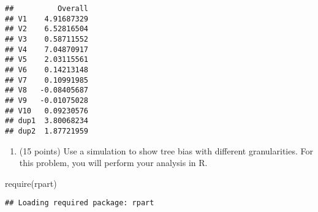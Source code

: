 \documentclass[
]{article}
\newenvironment{Shaded}{\begin{snugshade}}{\end{snugshade}}
\newcommand{\FunctionTok}[1]{\textcolor[rgb]{0.00,0.00,0.00}{#1}}
\newcommand{\NormalTok}[1]{#1}
\providecommand{\tightlist}{%
  \setlength{\itemsep}{0pt}\setlength{\parskip}{0pt}}
\begin{document}
\begin{verbatim}
##          Overall
## V1    4.91687329
## V2    6.52816504
## V3    0.58711552
## V4    7.04870917
## V5    2.03115561
## V6    0.14213148
## V7    0.10991985
## V8   -0.08405687
## V9   -0.01075028
## V10   0.09230576
## dup1  3.80068234
## dup2  1.87721959
\end{verbatim}

\begin{enumerate}
\def\labelenumi{\arabic{enumi}.}
\setcounter{enumi}{4}
\tightlist
\item
  (15 points) Use a simulation to show tree bias with different
  granularities. For this problem, you will perform your analysis in R.
\end{enumerate}

\begin{Shaded}
\begin{Highlighting}[]
\FunctionTok{require}\NormalTok{(rpart)}
\end{Highlighting}
\end{Shaded}

\begin{verbatim}
## Loading required package: rpart
\end{verbatim}
\end{document}
